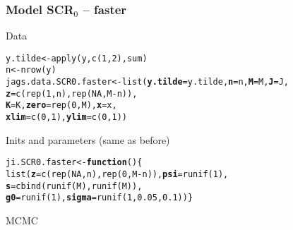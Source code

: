 \documentclass[color=usenames,dvipsnames]{beamer}\usepackage[]{graphicx}\usepackage[]{xcolor}
\makeatletter
\newcommand{\hlnum}[1]{\textcolor[rgb]{0.69,0.494,0}{#1}}%
\newcommand{\hlopt}[1]{\textcolor[rgb]{0,0,0}{#1}}%
\newcommand{\hldef}[1]{\textcolor[rgb]{0,0,0}{#1}}%
\newcommand{\hlkwa}[1]{\textcolor[rgb]{0,0,0}{\textbf{#1}}}%
\newcommand{\hlkwb}[1]{\textcolor[rgb]{0,0.341,0.682}{#1}}%
\newcommand{\hlkwc}[1]{\textcolor[rgb]{0,0,0}{\textbf{#1}}}%
\newcommand{\hlkwd}[1]{\textcolor[rgb]{0.004,0.004,0.506}{#1}}%
\newenvironment{kframe}{%
 \def\at@end@of@kframe{}%
 \ifinner\ifhmode%
  \def\at@end@of@kframe{\end{minipage}}%
  \begin{minipage}{\columnwidth}%
 \fi\fi%
 \def\FrameCommand##1{\hskip\@totalleftmargin \hskip-\fboxsep
 \colorbox{shadecolor}{##1}\hskip-\fboxsep
     \hskip-\linewidth \hskip-\@totalleftmargin \hskip\columnwidth}%
 \MakeFramed {\advance\hsize-\width
   \@totalleftmargin\z@ \linewidth\hsize
   \@setminipage}}%
 {\par\unskip\endMakeFramed%
 \at@end@of@kframe}
\newenvironment{knitrout}{}{} %
\makeatother
\begin{document}
\begin{frame}[fragile]
  \frametitle{Model SCR$_0$ -- faster}
  Data
  \vspace{-6pt}
\begin{knitrout}\scriptsize
{}\color{fgcolor}\begin{kframe}
\begin{alltt}
\hldef{y.tilde} \hlkwb{<-} \hlkwd{apply}\hldef{(y,} \hlkwd{c}\hldef{(}\hlnum{1}\hldef{,}\hlnum{2}\hldef{), sum)}
\hldef{n} \hlkwb{<-} \hlkwd{nrow}\hldef{(y)}
\hldef{jags.data.SCR0.faster} \hlkwb{<-} \hlkwd{list}\hldef{(}\hlkwc{y.tilde}\hldef{=y.tilde,} \hlkwc{n}\hldef{=n,} \hlkwc{M}\hldef{=M,} \hlkwc{J}\hldef{=J,}
                              \hlkwc{z}\hldef{=}\hlkwd{c}\hldef{(}\hlkwd{rep}\hldef{(}\hlnum{1}\hldef{, n),} \hlkwd{rep}\hldef{(}\hlnum{NA}\hldef{, M}\hlopt{-}\hldef{n)),}
                              \hlkwc{K}\hldef{=K,} \hlkwc{zero}\hldef{=}\hlkwd{rep}\hldef{(}\hlnum{0}\hldef{, M),} \hlkwc{x}\hldef{=x,}
                              \hlkwc{xlim}\hldef{=}\hlkwd{c}\hldef{(}\hlnum{0}\hldef{,}\hlnum{1}\hldef{),} \hlkwc{ylim}\hldef{=}\hlkwd{c}\hldef{(}\hlnum{0}\hldef{,}\hlnum{1}\hldef{))}
\end{alltt}
\end{kframe}
\end{knitrout}
\pause
\vfill
  Inits and parameters (same as before)
\pause
\vfill
\begin{knitrout}\scriptsize
{}\color{fgcolor}\begin{kframe}
\begin{alltt}
\hldef{ji.SCR0.faster} \hlkwb{<-} \hlkwa{function}\hldef{() \{}
    \hlkwd{list}\hldef{(}\hlkwc{z}\hldef{=}\hlkwd{c}\hldef{(}\hlkwd{rep}\hldef{(}\hlnum{NA}\hldef{, n),} \hlkwd{rep}\hldef{(}\hlnum{0}\hldef{,M}\hlopt{-}\hldef{n)),} \hlkwc{psi}\hldef{=}\hlkwd{runif}\hldef{(}\hlnum{1}\hldef{),}
         \hlkwc{s}\hldef{=}\hlkwd{cbind}\hldef{(}\hlkwd{runif}\hldef{(M),} \hlkwd{runif}\hldef{(M)),}
         \hlkwc{g0}\hldef{=}\hlkwd{runif}\hldef{(}\hlnum{1}\hldef{),} \hlkwc{sigma}\hldef{=}\hlkwd{runif}\hldef{(}\hlnum{1}\hldef{,} \hlnum{0.05}\hldef{,} \hlnum{0.1}\hldef{)) \}}
\end{alltt}
\end{kframe}
\end{knitrout}
MCMC
  \vspace{-6pt}
\begin{knitrout}\scriptsize
{}\color{fgcolor}\begin{kframe}

\end{kframe}
\end{knitrout}
\end{frame}
\end{document}
